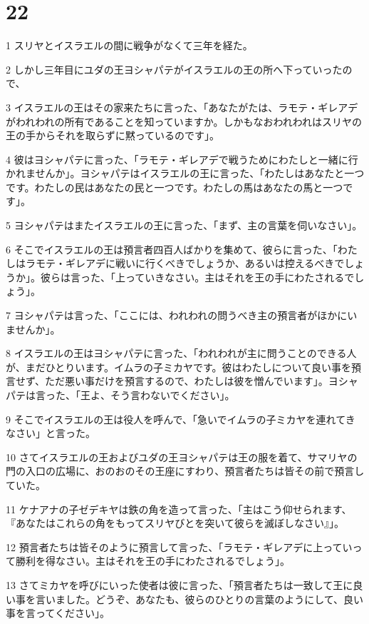 \chapter{22}

\par 1 スリヤとイスラエルの間に戦争がなくて三年を経た。
\par 2 しかし三年目にユダの王ヨシャパテがイスラエルの王の所へ下っていったので、
\par 3 イスラエルの王はその家来たちに言った、「あなたがたは、ラモテ・ギレアデがわれわれの所有であることを知っていますか。しかもなおわれわれはスリヤの王の手からそれを取らずに黙っているのです」。
\par 4 彼はヨシャパテに言った、「ラモテ・ギレアデで戦うためにわたしと一緒に行かれませんか」。ヨシャパテはイスラエルの王に言った、「わたしはあなたと一つです。わたしの民はあなたの民と一つです。わたしの馬はあなたの馬と一つです」。
\par 5 ヨシャパテはまたイスラエルの王に言った、「まず、主の言葉を伺いなさい」。
\par 6 そこでイスラエルの王は預言者四百人ばかりを集めて、彼らに言った、「わたしはラモテ・ギレアデに戦いに行くべきでしょうか、あるいは控えるべきでしょうか」。彼らは言った、「上っていきなさい。主はそれを王の手にわたされるでしょう」。
\par 7 ヨシャパテは言った、「ここには、われわれの問うべき主の預言者がほかにいませんか」。
\par 8 イスラエルの王はヨシャパテに言った、「われわれが主に問うことのできる人が、まだひとりいます。イムラの子ミカヤです。彼はわたしについて良い事を預言せず、ただ悪い事だけを預言するので、わたしは彼を憎んでいます」。ヨシャパテは言った、「王よ、そう言わないでください」。
\par 9 そこでイスラエルの王は役人を呼んで、「急いでイムラの子ミカヤを連れてきなさい」と言った。
\par 10 さてイスラエルの王およびユダの王ヨシャパテは王の服を着て、サマリヤの門の入口の広場に、おのおのその王座にすわり、預言者たちは皆その前で預言していた。
\par 11 ケナアナの子ゼデキヤは鉄の角を造って言った、「主はこう仰せられます、『あなたはこれらの角をもってスリヤびとを突いて彼らを滅ぼしなさい』」。
\par 12 預言者たちは皆そのように預言して言った、「ラモテ・ギレアデに上っていって勝利を得なさい。主はそれを王の手にわたされるでしょう」。
\par 13 さてミカヤを呼びにいった使者は彼に言った、「預言者たちは一致して王に良い事を言いました。どうぞ、あなたも、彼らのひとりの言葉のようにして、良い事を言ってください」。
